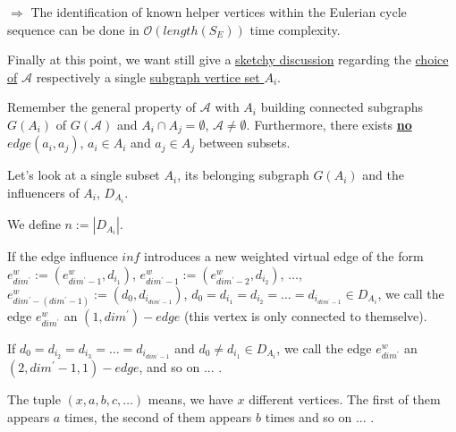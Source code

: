 \documentclass{article}
\newtheorem*{theorem A}{Theorem A}
\newtheorem*{theorem B}{N\"olker's Theorem}
\theoremstyle{remark}
\theoremstyle{remark}
\begin{document}
\begin{enumerate}
        \vspace{0.3cm}
        $\Rightarrow$ The identification of known helper vertices within the Eulerian cycle sequence can be done in $\mathcal{O}\left(length\left(S_{E}\right)\right)$ time complexity.

\label{enum:helpervertices}
\end{enumerate}


\vspace{0.3cm}
Finally at this point, we want still give a \underline{sketchy discussion} regarding the \underline{choice of} $\mathcal{A}$ respectively a single \underline{subgraph vertice set $A_{i}$}.

\vspace{0.3cm}
Remember the general property of $\mathcal{A}$ with $A_{i}$ building connected subgraphs $G\left(A_{i}\right)$ of $G\left(\mathcal{A}\right)$ and $A_{i} \cap A_{j} = \emptyset$, $\mathcal{A} \neq \emptyset$. Furthermore, there exists \underline{\textbf{no} $edge\left(a_{i}, a_{j}\right)$}, $a_{i} \in A_{i}$ and $a_{j} \in A_{j}$ between subsets.

\vspace{0.3cm}
Let's look at a single subset $A_{i}$, its belonging subgraph $G\left(A_{i}\right)$ and the influencers of $A_{i}$, $D_{A_{i}}$.

\vspace{0.3cm}
We define $n := |D_{A_{i}}|$.

\vspace{0.3cm}
If the edge influence $inf$ introduces a new weighted virtual edge of the form $e^{w}_{dim^{\prime}} := \left(e^{w}_{dim^{\prime} - 1}, d_{i_{1}}\right)$, $e^{w}_{dim^{\prime} - 1} := \left(e^{w}_{dim^{\prime} - 2}, d_{i_{2}}\right)$, $\dots$, $e^{w}_{dim^{\prime} - \left(dim^{\prime} - 1\right)} := \left(d_{0}, d_{i_{dim^{\prime} - 1}}\right)$, $d_{0} = d_{i_{1}} = d_{i_{2}} = \dots = d_{i_{dim^{\prime} - 1}} \in D_{A_{i}}$, we call the edge $e^{w}_{dim^{\prime}}$ an $\left(1,dim^{\prime}\right)-edge$ (this vertex is only connected to themselve).

\vspace{0.3cm}
If $d_{0} = d_{i_{2}} = d_{i_{3}} = \dots = d_{i_{dim^{\prime} - 1}}$ and $d_{0} \neq d_{i_{1}} \in D_{A_{i}}$, we call the edge $e^{w}_{dim^{\prime}}$ an $\left(2, dim^{\prime} - 1, 1\right)-edge$, and so on ... .

\vspace{0.3cm}
The tuple $\left(x, a, b, c, \dots \right)$ means, we have $x$ different vertices. The first of them appears $a$ times, the second of them appears $b$ times and so on ... .
\end{document}
